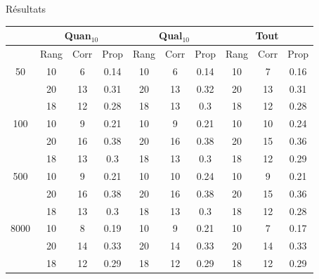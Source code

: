 \documentclass{beamer}
\begin{document}
\begin{frame}{Résultats}
\begin{table}[H]

\begin{tabular}{|@{}c@{}|@{}c@{}|@{}c@{}|@{}c@{}||@{}c@{}|@{}c@{}|@{}c@{}||@{}c@{}|@{}c@{}|@{}c@{}|}

\hline
 & \multicolumn{3}{c|}{Quan$_{10}$} & \multicolumn{3}{c|}{Qual$_{10}$} & \multicolumn{3}{c|}{Tout} \\
 \hline
 & Rang & Corr & Prop & Rang & Corr & Prop & Rang & Corr & Prop \\
 \hline
 50 & 10  & 6 & 0.14 & 10  & 6 & 0.14 & 10  & 7 & 0.16  \\
 \cline{2-10} 
    & 20 & 13 & 0.31 & 20  & 13 & 0.32 & 20  & 13 & 0.31  \\
 \cline{2-10} 
    & 18 & 12 & 0.28 & 18 & 13 & 0.3 & 18 & 12 & 0.28  \\
  \hline
   100 & 10  & 9 & 0.21 & 10  & 9 & 0.21 & 10  & 10 & 0.24  \\
 \cline{2-10} 
    & 20 & 16 & 0.38 & 20 & 16 & 0.38 & 20 & 15 & 0.36  \\
  \cline{2-10} 
    & 18 & 13 & 0.3 & 18 & 13 & 0.3 & 18 & 12 & 0.29  \\
  \hline
   500 & 10  & 9 & 0.21 & 10  & 10 & 0.24 & 10  & 9 & 0.21  \\
 \cline{2-10} 
    & 20 & 16 & 0.38 & 20 & 16 & 0.38 & 20 & 15 & 0.36  \\
  \cline{2-10} 
    & 18 & 13 & 0.3 & 18 & 13 & 0.3 & 18 & 12 & 0.28  \\
  \hline
   8000 & 10 & 8 & 0.19 & 10 & 9 & 0.21 & 10 & 7 & 0.17  \\
 \cline{2-10} 
    & 20 & 14 & 0.33 & 20 & 14 & 0.33 & 20 & 14 & 0.33  \\
  \cline{2-10} 
    & 18 & 12 & 0.29 & 18 & 12 & 0.29 & 18 & 12 & 0.29  \\
  \hline

\end{tabular}
\end{table}
\end{frame}
\end{document}
